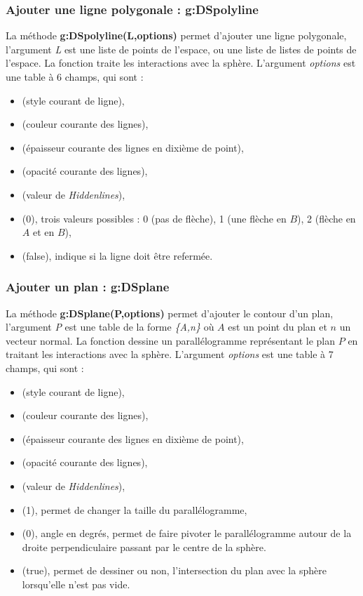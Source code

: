 \subsubsection{ Ajouter une ligne polygonale : g:DSpolyline}

La méthode \textbf{g:DSpolyline(L,options)} permet d'ajouter une ligne polygonale, l'argument \emph{L} est une liste de points de l'espace, ou une liste de listes de points de l'espace. La fonction traite les interactions avec la sphère. L'argument \emph{options} est une table à 6 champs, qui sont :
    \begin{itemize}
        \item {} (style courant de ligne), 
        \item {} (couleur courante des lignes),
        \item {} (épaisseur courante des lignes en dixième de point),
        \item {} (opacité courante des lignes),
        \item {} (valeur de \emph{Hiddenlines}),
        \item {} (0), trois valeurs possibles : 0 (pas de flèche), 1 (une flèche en $B$), 2 (flèche en $A$ et en $B$),
        \item {} (false), indique si la ligne doit être refermée.
    \end{itemize}    

\subsubsection{Ajouter un plan : g:DSplane}

La méthode \textbf{g:DSplane(P,options)} permet d'ajouter le contour d'un plan, l'argument \emph{P} est une table de la forme \emph{\{A,n\}} où $A$ est un point du plan et $n$ un vecteur normal. La fonction dessine un parallélogramme représentant le plan $P$ en traitant les interactions avec la sphère. L'argument \emph{options} est une table à 7 champs, qui sont :
    \begin{itemize}
        \item {} (style courant de ligne), 
        \item {} (couleur courante des lignes),
        \item {} (épaisseur courante des lignes en dixième de point),
        \item {} (opacité courante des lignes),
        \item {} (valeur de \emph{Hiddenlines}),
        \item {} (1), permet de changer la taille du parallélogramme,
        \item {} (0), angle en degrés, permet de faire pivoter le parallélogramme autour de la droite perpendiculaire passant par le centre de la sphère.
        \item {} (true), permet de dessiner ou non, l'intersection du plan avec la sphère lorsqu'elle n'est pas vide.
    \end{itemize}    

